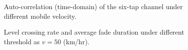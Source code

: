 \documentclass[12pt, draftclsnofoot, onecolumn]{IEEEtran}
\begin{document}
\begin{figure}[t!]
\centering
{}
\caption{Auto-correlation (time-domain) of the six-tap channel under different mobile velocity.}\label{fig:autocorr_channel_time}
\end{figure}

\begin{figure}[t!]
\centering
{}
\caption{Level crossing rate and average fade duration under different threshold as $v = 50$ (km/hr).}\label{fig:level crossing50}
\end{figure}
\end{document}
